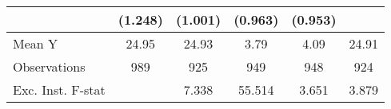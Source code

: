 {\begin{tabular}{l*{5}{c}}
            &     (1.248)         &     (1.001)         &     (0.963)         &     (0.953)         &                     \\
\midrule
Mean Y      &       24.95         &       24.93         &        3.79         &        4.09         &       24.91         \\
Observations&         989         &         925         &         949         &         948         &         924         \\
Exc. Inst. F-stat&                     &       7.338         &      55.514         &       3.651         &       3.879         \\
\bottomrule
\end{tabular}
}
